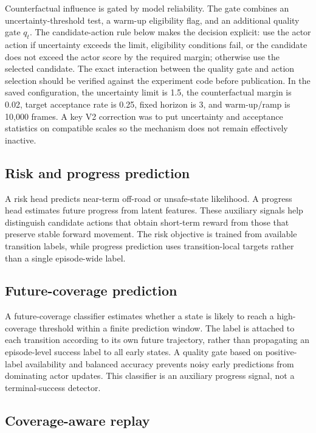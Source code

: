 \documentclass[11pt]{article}
\begin{document}
Counterfactual influence is gated by model reliability. The gate combines
an uncertainty-threshold test, a warm-up eligibility flag, and an additional
quality gate $q_t$. The candidate-action rule below makes the decision
explicit: use the actor action if uncertainty exceeds the limit, eligibility
conditions fail, or the candidate does not exceed the actor score by the
required margin; otherwise use the selected candidate. The exact interaction
between the quality gate and action selection should be verified against the
experiment code before publication. In the saved
configuration, the uncertainty limit is 1.5, the counterfactual margin
is 0.02, target acceptance rate is 0.25, fixed horizon is 3, and
warm-up/ramp is 10,000 frames. A key V2 correction was to put
uncertainty and acceptance statistics on compatible scales so the
mechanism does not remain effectively inactive.

\subsection{Risk and progress
prediction}\label{risk-and-progress-prediction}

A risk head predicts near-term off-road or unsafe-state likelihood. A
progress head estimates future progress from latent features. These
auxiliary signals help distinguish candidate actions that obtain
short-term reward from those that preserve stable forward movement. The
risk objective is trained from available transition labels, while
progress prediction uses transition-local targets rather than a single
episode-wide label.

\subsection{Future-coverage
prediction}\label{future-coverage-prediction}

A future-coverage classifier estimates whether a state is likely to
reach a high-coverage threshold within a finite prediction window. The
label is attached to each transition according to its own future
trajectory, rather than propagating an episode-level success label to
all early states. A quality gate based on positive-label availability
and balanced accuracy prevents noisy early predictions from dominating
actor updates. This classifier is an auxiliary progress signal, not a
terminal-success detector.

\subsection{Coverage-aware replay}\label{coverage-aware-replay}
\end{document}

